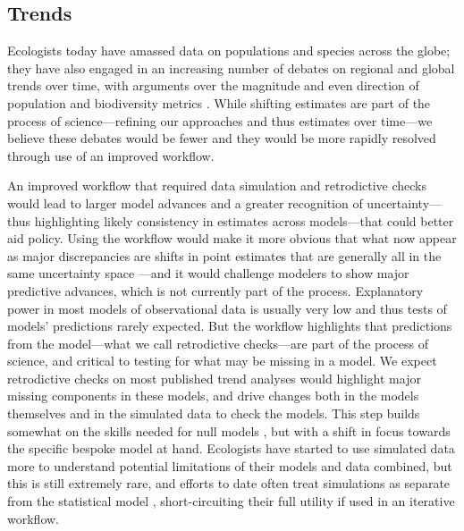 \documentclass[11pt]{article}
\begin{document}
\subsection{Trends}

Ecologists today have amassed data on populations and species across the globe; they have also engaged in an increasing number of debates on regional and global trends over time, with arguments over the magnitude and even direction of population and biodiversity metrics \citep{Dornelas2014,Leung2020,terry2022no,muller2024weather}. While shifting estimates are part of the process of science---refining our approaches and thus estimates over time---we believe these debates would be fewer and they would be more rapidly resolved through use of an improved workflow. %

An improved workflow that required data simulation and retrodictive checks would lead to larger model advances and a greater recognition of uncertainty---thus highlighting likely consistency in estimates across models---that could better aid policy.  Using the workflow would make it more obvious that what now appear as major discrepancies are shifts in point estimates that are generally all in the same uncertainty space \citep{Johnson2024}---and it would challenge modelers to show major predictive advances, which is not currently part of the process. Explanatory power in most models of observational data is usually very low \citep{low2014rising,moller2002much} and thus tests of models' predictions rarely expected. But the workflow highlights that predictions from the model---what we call retrodictive checks---are part of the process of science, and critical to testing for what may be missing in a model. We expect retrodictive checks on most published trend analyses would highlight major missing components in these models, and drive changes both in the models themselves and in the simulated data to check the models. This step builds somewhat on the skills needed for null models \citep{Gotelli:2012oz}, but with a shift in focus towards the specific bespoke model at hand. Ecologists have started to use simulated data more to understand potential limitations of their models and data combined, but this is still extremely rare, and efforts to date often treat simulations as separate from the statistical model \citep{Buschke2021,dove2023quantifying}, short-circuiting their full utility if used in an iterative workflow.
\end{document}
